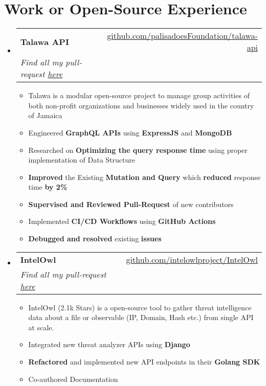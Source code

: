 \documentclass[letterpaper,11pt]{article}
\makeatletter
\newcommand{\resumeItem}[1]{
  \item\small{
    {#1 \vspace{-2pt}}
  }
}
\newcommand{\resumeSubheading}[4]{
  \vspace{-2pt}\item
    \begin{tabular*}{0.97\textwidth}[t]{l@{\extracolsep{\fill}}r}
      \textbf{#1} & #2 \\
      \textit{\small#3} & \textit{\small #4} \\
    \end{tabular*}\vspace{-7pt}
}
\newcommand{\resumeSubSubheading}[2]{
    \item
    \begin{tabular*}{0.97\textwidth}{l@{\extracolsep{\fill}}r}
      \textit{\small#1} & \textit{\small #2} \\
    \end{tabular*}\vspace{-7pt}
}
\newcommand{\resumeSubHeadingListStart}{\begin{itemize}[leftmargin=0.15in, label={}]}
\newcommand{\resumeSubHeadingListEnd}{\end{itemize}}
\newcommand{\resumeItemListStart}{\begin{itemize}}
\newcommand{\resumeItemListEnd}{\end{itemize}\vspace{-5pt}}
\makeatother
\begin{document}
\section{Work or Open-Source Experience}
  \resumeSubHeadingListStart
    \resumeSubheading
      {Talawa API}{\href{https://github.com/palisadoesFoundation/talawa-api}{github.com/palisadoesFoundation/talawa-api}}
      {Find all my pull-request \href{https://shorten.codes/prs}{here}}{}
      \resumeItemListStart
        \resumeItem{Talawa is a modular open-source project to manage group activities of both non-profit organizations and businesses widely used in the
country of Jamaica}
        \resumeItem{Engineered \textbf{GraphQL APIs} using \textbf{ExpressJS} and \textbf{MongoDB}}
        \resumeItem{Researched on \textbf{Optimizing the query response time} using proper implementation of Data Structure}
        \resumeItem{\textbf{Improved} the Existing \textbf{Mutation and Query} which \textbf{reduced} response time \textbf{by 2\%}}
        \resumeItem{\textbf{Supervised and Reviewed Pull-Request} of new contributors}
        \resumeItem{Implemented \textbf{CI/CD Workflows} using \textbf{GitHub Actions}}
        \resumeItem{\textbf{Debugged and resolved} existing \textbf{issues}}
      \resumeItemListEnd
      
    \resumeSubheading
      {IntelOwl}{\href{https://github.com/intelowlproject/IntelOwl}{github.com/intelowlproject/IntelOwl}}
      {Find all my pull-request \href{https://shorten.codes/prs}{here}}{}
      \resumeItemListStart
        \resumeItem{IntelOwl (2.1k Stars) is a open-source tool to gather threat intelligence data about a
file or observable (IP, Domain, Hash etc.) from single API at scale.}
        \resumeItem{Integrated new threat analyzer APIs using \textbf{Django}}
        \resumeItem{\textbf{Refactored} and implemented new API endpoints in their \textbf{Golang SDK}}
        \resumeItem{Co-authored Documentation}
      \resumeItemListEnd


  \resumeSubHeadingListEnd


\end{document}
